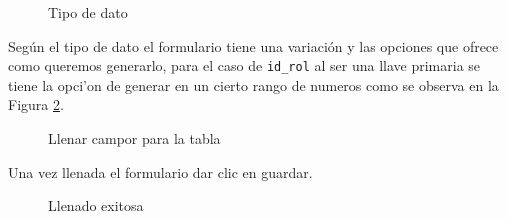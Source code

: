 \begin{figure}[H]
\caption{Tipo de dato}
\label{configuracionforanea}
\centering
{}
\end{figure}
Seg\'un el tipo de dato el formulario tiene una variaci\'on y las opciones que ofrece como queremos generarlo,
para el caso de \texttt{id\_rol} al ser una llave primaria se tiene la opci'on de generar en un cierto rango de numeros como se observa en la Figura \ref{fillfieldsfortablerange}.
\begin{figure}[H]
\caption{Llenar campor para la tabla}
\label{fillfieldsfortablerange}
\centering
{}
\end{figure}
Una vez llenada el formulario dar clic en guardar.
\begin{figure}[H]
\caption{Llenado exitosa}
\centering
{}
\end{figure}
